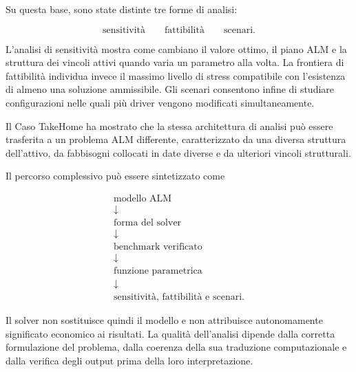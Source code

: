 Su questa base, sono state distinte tre forme di analisi:

$$
\text{sensitivit\`a}
\qquad
\text{fattibilit\`a}
\qquad
\text{scenari}.
$$

L'analisi di sensitivit\`a mostra come cambiano il valore ottimo, il piano ALM
e la struttura dei vincoli attivi quando varia un parametro alla volta. La
frontiera di fattibilit\`a individua invece il massimo livello di stress
compatibile con l'esistenza di almeno una soluzione ammissibile. Gli scenari
consentono infine di studiare configurazioni nelle quali pi\`u driver vengono
modificati simultaneamente.

Il Caso TakeHome ha mostrato che la stessa architettura di analisi pu\`o
essere trasferita a un problema ALM differente, caratterizzato da una diversa
struttura dell'attivo, da fabbisogni collocati in date diverse e da ulteriori
vincoli strutturali.

Il percorso complessivo pu\`o essere sintetizzato come

$$
\begin{array}{c}
\text{modello ALM}
\\[3pt]
\downarrow
\\[3pt]
\text{forma del solver}
\\[3pt]
\downarrow
\\[3pt]
\text{benchmark verificato}
\\[3pt]
\downarrow
\\[3pt]
\text{funzione parametrica}
\\[3pt]
\downarrow
\\[3pt]
\text{sensitivit\`a, fattibilit\`a e scenari}.
\end{array}
$$

Il solver non sostituisce quindi il modello e non attribuisce autonomamente
significato economico ai risultati. La qualit\`a dell'analisi dipende dalla
corretta formulazione del problema, dalla coerenza della sua traduzione
computazionale e dalla verifica degli output prima della loro interpretazione.
